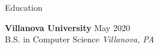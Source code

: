 \documentclass[
	11pt, %
]{resume} %
\begin{document}

\begin{rSection}{Education}
	
	\textbf{Villanova University} \hfill May 2020 \\
	B.S. in Computer Science \hfill \textit{Villanova, PA} \\
	
\end{rSection}

\end{document}
